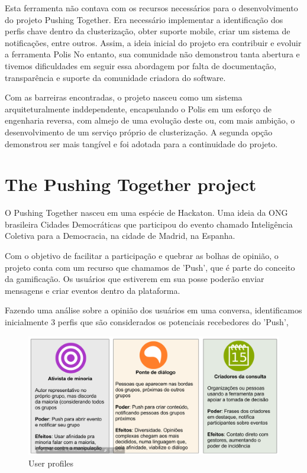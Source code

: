 \documentclass{llncs}
\begin{document}
 Esta ferramenta não contava com os recursos necessários para o desenvolvimento
 do projeto Pushing Together. Era necessário implementar a identificação dos perfis
 chave dentro da clusterização, obter suporte mobile, criar um sistema de notificações,
 entre outros. Assim, a ideia inicial do projeto era contribuir e evoluir a ferramenta Polis
 No entanto, sua comunidade não demonstrou tanta abertura e tivemos dificuldades
 em seguir essa abordagem por falta de documentação, transparência e suporte da
 comunidade criadora do software.

 Com as barreiras encontradas, o projeto nasceu como um sistema arquiteturalmente
 inddependente, encapsulando o Polis em um esforço de engenharia reversa,
 com almejo de uma evolução deste ou, com mais ambição, o desenvolvimento de um serviço próprio
 de clusterização. A segunda opção demonstrou ser mais tangível e foi adotada
 para a continuidade do projeto.

\section{The Pushing Together project}
\label{sec:pushingtogether}

 O Pushing Together nasceu em uma espécie de Hackaton. Uma
 ideia da ONG brasileira Cidades Democráticas que participou do evento chamado Inteligência Coletiva
 para a Democracia, na cidade de Madrid, na Espanha.

 Com o objetivo de facilitar a participação e quebrar as bolhas de opinião,
 o projeto conta com um recurso que chamamos de 'Push', que é parte do conceito
 da gamificação. Os usuários que estiverem em sua posse poderão enviar mensagens
 e criar eventos dentro da plataforma.

 Fazendo uma análise sobre a opinião dos usuários em uma conversa, identificamos
 inicialmente 3 perfis que são considerados os potenciais recebedores do 'Push',

 \begin{figure}[H]
   \centering
     \includegraphics[keepaspectratio=true,scale=0.25]{images/userprofiles.png}
   \caption{User profiles}
   \label{fig:architecture-2}
 \end{figure}
\end{document}

